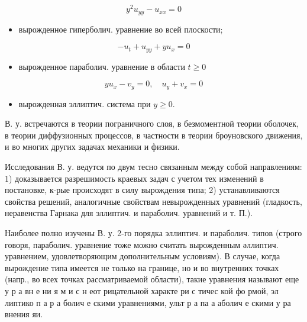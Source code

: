 \documentclass[10pt]{article}
\begin{document}
\[

y^{2} u_{y y}-u_{x x}=0

\]



\begin{itemize}

  \item вырожденное гиперболич. уравнение во всей плоскости;

\end{itemize}



\[

-u_{t}+u_{y y}+y u_{x}=0

\]



\begin{itemize}

  \item вырожденное параболич. уравнение в области $t \geqslant 0$

\end{itemize}



\[

y u_{x}-v_{y}=0, \quad u_{y}+v_{x}=0

\]



\begin{itemize}

  \item вырожденная эллиптич. система при $y \geqslant 0$.

\end{itemize}



В. у. встречаются в теории пограничного слоя, в безмоментной теории оболочек, в теории диффузионных процессов, в частности в теории броуновского движения, и во многих других задачах механики и физики.



Исследования В. у. ведутся по двум тесно связанным между собой направлениям: 1) доказывается разрешимость краевых задач с учетом тех изменений в постановке, к-рые происходят в силу вырождения типа; 2) устанавливаются свойства решений, аналогичные свойствам невырожденных уравнений (гладкость, неравенства Гарнака для эллиптич. и параболич. уравнений и т. П.).



Наиболее полно изучены В. у. 2-го порядка эллиптич. и параболич. типов (строго говоря, параболич. уравнение тоже можно считать вырожденным әллиптич. уравнением, удовлетворяющим дополнительным условиям). В случае, когда вырождение типа имеется не только на границе, но и во внутренних точках (напр., во всех точках рассматриваемой области), такие уравнения называют еще у р а вн е ни я м и с н еот рицательной характе ри с тичес кой фо рмой, эл липтико п а р а болич е скими уравнениями, ульт р а па а аболич е скими у ра внения яи.
\end{document}
